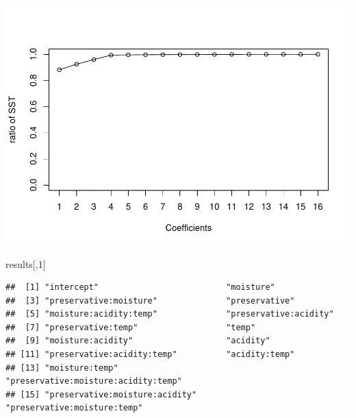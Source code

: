 \documentclass[
]{book}
\newenvironment{Shaded}{\begin{snugshade}}{\end{snugshade}}
\newcommand{\DecValTok}[1]{\textcolor[rgb]{0.00,0.00,0.81}{#1}}
\newcommand{\NormalTok}[1]{#1}
\begin{document}
\includegraphics{12-FactorialExperiments_files/figure-latex/unnamed-chunk-4-1.pdf}

\begin{Shaded}
\begin{Highlighting}[]
\NormalTok{results[,}\DecValTok{1}\NormalTok{]}
\end{Highlighting}
\end{Shaded}

\begin{verbatim}
##  [1] "intercept"                          "moisture"                          
##  [3] "preservative:moisture"              "preservative"                      
##  [5] "moisture:acidity:temp"              "preservative:acidity"              
##  [7] "preservative:temp"                  "temp"                              
##  [9] "moisture:acidity"                   "acidity"                           
## [11] "preservative:acidity:temp"          "acidity:temp"                      
## [13] "moisture:temp"                      "preservative:moisture:acidity:temp"
## [15] "preservative:moisture:acidity"      "preservative:moisture:temp"
\end{verbatim}
\end{document}
